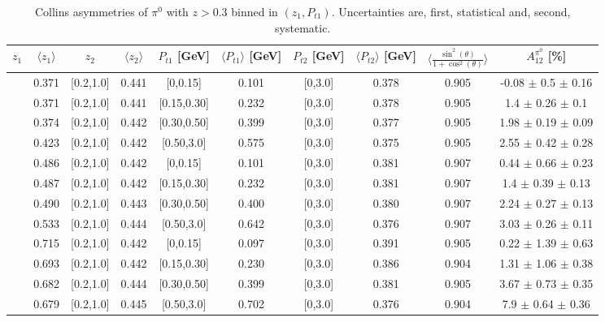 \begin{table}[H]\tiny
\centering
\begin{tabular}{|c| c| c| c| c| c| c| c| c| c|}
\hline
$z_1$& $\langle  z_{1}  \rangle$ & $z_2$ & $\langle  z_{2}\rangle$& $P_{t1}$ [GeV] & $\langle  P_{t1} \rangle$ [GeV] & $P_{t2}$ [GeV] &  $\langle P_{t2}\rangle$ [GeV] &$\langle\frac{\sin^2(\theta)}{1+\cos^2(\theta)}\rangle$& $A_{12}^{\pi^0}$ [\%]   \\ \hline
[0.3,0.5]	&	0.371	&	[0.2,1.0]	&	0.441	&	[0,0.15]	&	0.101	&	[0,3.0]	&	0.378	&	0.905	& -0.08  $\pm$ 0.5  $\pm$ 0.16     \\ \hline
[0.3,0.5]	&	0.371	&	[0.2,1.0]	&	0.441	&	[0.15,0.30]	&	0.232	&	[0,3.0]	&	0.378	&	0.905	& 1.4  $\pm$ 0.26  $\pm$ 0.1       \\ \hline
[0.3,0.5]	&	0.374	&	[0.2,1.0]	&	0.442	&	[0.30,0.50]	&	0.399	&	[0,3.0]	&	0.377	&	0.905	& 1.98  $\pm$ 0.19  $\pm$ 0.09     \\ \hline
[0.3,0.5]	&	0.423	&	[0.2,1.0]	&	0.442	&	[0.50,3.0]	&	0.575	&	[0,3.0]	&	0.375	&	0.905	& 2.55  $\pm$ 0.42  $\pm$ 0.28     \\ \hline
\hline
[0.5,0.7]	&	0.486	&	[0.2,1.0]	&	0.442	&	[0,0.15]	&	0.101	&	[0,3.0]	&	0.381	&	0.907	& 0.44  $\pm$ 0.66  $\pm$ 0.23     \\ \hline
[0.5,0.7]	&	0.487	&	[0.2,1.0]	&	0.442	&	[0.15,0.30]	&	0.232	&	[0,3.0]	&	0.381	&	0.907	& 1.4  $\pm$ 0.39  $\pm$ 0.13      \\ \hline
[0.5,0.7]	&	0.490	&	[0.2,1.0]	&	0.443	&	[0.30,0.50]	&	0.400	&	[0,3.0]	&	0.380	&	0.907	& 2.24  $\pm$ 0.27  $\pm$ 0.13     \\ \hline
[0.5,0.7]	&	0.533	&	[0.2,1.0]	&	0.444	&	[0.50,3.0]	&	0.642	&	[0,3.0]	&	0.376	&	0.907	& 3.03  $\pm$ 0.26  $\pm$ 0.11     \\ \hline
\hline
[0.7,1.0]	&	0.715	&	[0.2,1.0]	&	0.442	&	[0,0.15]	&	0.097	&	[0,3.0]	&	0.391	&	0.905	& 0.22  $\pm$ 1.39  $\pm$ 0.63     \\ \hline
[0.7,1.0]	&	0.693	&	[0.2,1.0]	&	0.442	&	[0.15,0.30]	&	0.230	&	[0,3.0]	&	0.386	&	0.904	& 1.31  $\pm$ 1.06  $\pm$ 0.38     \\ \hline
[0.7,1.0]	&	0.682	&	[0.2,1.0]	&	0.444	&	[0.30,0.50]	&	0.399	&	[0,3.0]	&	0.381	&	0.905	& 3.67  $\pm$ 0.73  $\pm$ 0.35     \\ \hline
[0.7,1.0]	&	0.679	&	[0.2,1.0]	&	0.445	&	[0.50,3.0]	&	0.702	&	[0,3.0]	&	0.376	&	0.904	& 7.9  $\pm$ 0.64  $\pm$ 0.36   	\\ \hline
\end{tabular}
\caption[Collins asymmetries of $\pi^0$ with $z>0.3$ binned in $(z_{1},P_{t1})$]{Collins asymmetries of $\pi^0$ with $z>0.3$ binned in $(z_{1},P_{t1})$. Uncertainties are, first, statistical and, second, systematic.}
\label{tab:finaletaptbins}
\end{table}

